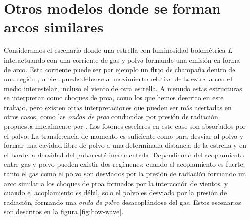 \chapter{Otros modelos donde se forman arcos similares}
\label{app:future-work}
Consideramos el escenario donde una estrella con luminosidad bolométrica $L$ interactuando con una corriente de gas y polvo formando una emisión en forma de arco. Esta corriente puede ser por ejemplo un flujo de champaña dentro de una región , o bien puede deberse al movimiento relativo de la estrella con el medio interestelar, incluso el viento de otra estrella. A menudo estas estructuras se interpretan como choques de proa, como los que hemos descrito en este trabajo, pero existen otras interpretaciones que pueden ser más acertadas en otros casos, como las \textit{ondas de proa} conducidas por presión de radiación, propuesta inicialmente por \citet{Van-Buren:1988}. Los fotones estelares en este caso son absorbidos por el polvo. La transferencia de momento es suficiente como para desviar al polvo y formar una cavidad libre de polvo a una determinada distancia de la estrella y en el borde la densidad del polvo está incrementada. Dependiendo del acoplamiento entre gas y polvo pueden existir dos regímenes: cuando el acoplamiento es fuerte, tanto el gas como el polvo son desviados por la presión de radiación formando un arco similar a los choques de proa formados por la interacción de vientos, y cuando el acoplamiento es débil, solo el polvo es desviado por la presión de radiación, formando una \textit{onda de polvo} desacoplándose del gas. Estos escenarios son descritos en la figura \ref{fig:bow-wave}.


